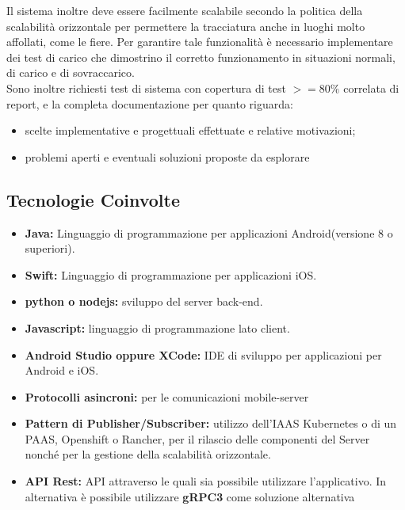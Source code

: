 	Il sistema inoltre deve essere facilmente scalabile secondo la politica della scalabilità orizzontale per permettere la tracciatura anche in luoghi molto affollati, come le fiere. Per garantire tale funzionalità è necessario implementare dei test di carico che dimostrino il corretto funzionamento in situazioni normali, di carico e di sovraccarico.\\
	Sono inoltre richiesti test di sistema con copertura di test $>=80\%$ correlata di report, e la completa documentazione per quanto riguarda:
	\begin{itemize}
		\item scelte implementative e progettuali effettuate e relative motivazioni;
		\item problemi aperti e eventuali soluzioni proposte da esplorare
	\end{itemize}
	\subsection{Tecnologie Coinvolte}
	\begin{itemize}
		\item \textbf{Java:} Linguaggio di programmazione per applicazioni Android(versione 8 o superiori).
		\item \textbf{Swift:} Linguaggio di programmazione per applicazioni iOS.
		\item \textbf{python o nodejs:} sviluppo del server back-end.
		\item \textbf{Javascript:} linguaggio di programmazione lato client.
		\item \textbf{Android Studio oppure XCode:} IDE di sviluppo per applicazioni per Android e iOS.
		\item \textbf{Protocolli asincroni:} per le comunicazioni mobile-server
		\item \textbf{Pattern di Publisher/Subscriber:} utilizzo dell’IAAS Kubernetes o di un PAAS, Openshift o Rancher, per il rilascio delle componenti del Server nonché per la gestione della scalabilità orizzontale.
		\item \textbf{API Rest:} API attraverso le quali sia possibile utilizzare l'applicativo. In alternativa è possibile utilizzare \textbf{gRPC3} come soluzione alternativa
	\end{itemize}
	
